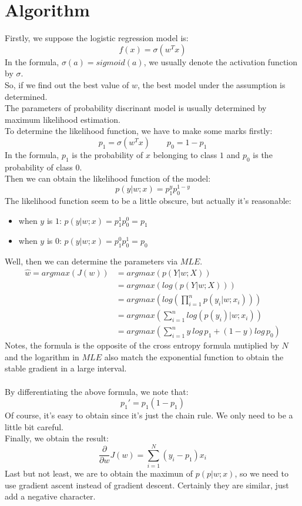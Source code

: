 \documentclass{report}
\begin{document}
\section{Algorithm}
Firstly, we suppose the logistic regression model is:
$$
f(x)=\sigma(w^Tx)
$$
In the formula, $\sigma(a)=sigmoid(a)$, we usually denote the activation function by $\sigma$.\\
So, if we find out the best value of $w$, the best model under the assumption is determined.\\
The parameters of probability discrinant model is usually determined by maximum likelihood estimation.\\
To determine the likelihood function, we have to make some marks firstly:
$$
p_1=\sigma(w^Tx) \qquad p_0=1-p_1
$$
In the formula, $p_1$ is the probability of $x$ belonging to class $1$ and $p_0$ is the probability of class $0$.\\
Then we can obtain the likelihood function of the model:
$$
p(y|w;x)=p_1^yp_0^{1-y}
$$
The likelihood function seem to be a little obscure, but actually it's reasonable:
\begin{itemize}
	\item when $y$ is $1$: $p(y|w;x)=p_1^1p_0^0=p_1$
	\item when $y$ is $0$: $p(y|w;x)=p_1^0p_0^1=p_0$
\end{itemize}
Well, then we can determine the parameters via $MLE$.
\begin{equation}
\begin{aligned}
\hat{w}=argmax(J(w))&=argmax(p(Y|w;X))\\
&=argmax(log(p(Y|w;X)))\\
&=argmax(log(\prod_{i=1}^n p(y_i|w;x_i)))\\
&=argmax(\sum_{i=1}^n log(p(y_i)|w;x_i))\\
&=argmax(\sum_{i=1}^n y\ log\, p_1+(1-y)log\,p_0)
\end{aligned}
\end{equation}
Notes, the formula is the opposite of the cross entropy formula mutiplied by $N$ and the logarithm in $MLE$ also match the exponential function to obtain the stable gradient in a large interval.\\\\
By differentiating the above formula, we note that:
$$
p_1'=p_1(1-p_1)
$$
Of course, it's easy to obtain since it's just the chain rule. We only need to be a little bit careful.\\
Finally, we obtain the result:
$$
\frac{\partial}{\partial w}J(w)=\sum_{i=1}^{N}\left(y_{i}-p_{1}\right) x_{i}
$$
Last but not least, we are to obtain the maximun of $p(p|w;x)$, so we need to use gradient ascent instead of gradient descent. Certainly they are similar, just add a negative character.
\end{document}
